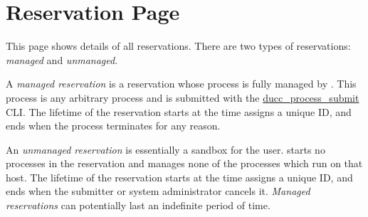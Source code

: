 % 
% 
% 
% 

\section{Reservation Page}
\label{sec:ws-reservations}

This page shows details of all reservations.  There are two types of reservations: {\em managed}
and {\em unmanaged}.

A {\em managed reservation} is a reservation whose process is fully managed by {\DUCC}.  This process
is any arbitrary process and is submitted with the
\hyperref[sec:cli.ducc-process-submit]{ducc\_process\_submit} CLI.  The lifetime of the reservation
starts at the time {\DUCC} assigns a unique ID, and ends when the process terminates for any reason.

An {\em unmanaged reservation} is essentially a sandbox for the user.  {\DUCC} starts no processes
in the reservation and manages none of the processes which run on that host.  The lifetime of the
reservation starts at the time {\DUCC} assigns a unique ID, and ends when the submitter or system
administrator cancels it.  {\em Managed reservations} can potentially last an indefinite
period of time.

